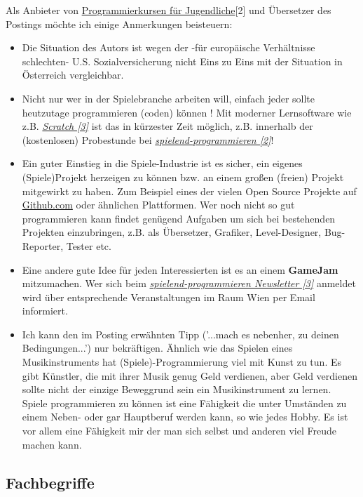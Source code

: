Als Anbieter von \href{http://spielend-programmieren.at}{Programmierkursen für Jugendliche}[2] und Übersetzer des Postings möchte ich einige Anmerkungen beisteuern:

\begin{itemize}
\item Die Situation des Autors ist wegen der -für europäische Verhältnisse schlechten- U.S. Sozialversicherung nicht Eins zu Eins mit der Situation in Österreich vergleichbar. 
\item Nicht nur wer in der Spielebranche arbeiten will, einfach jeder sollte heutzutage programmieren (coden) können ! Mit moderner Lernsoftware wie z.B. \href{http://scratch.mit.edu}{\textit{Scratch [3]}} ist das in kürzester Zeit möglich, z.B. innerhalb der (kostenlosen) Probestunde bei \href{http://spielend-programmieren.at}{\textit{spielend-programmieren [2]}}! 
\item Ein guter Einstieg in die Spiele-Industrie ist es sicher, ein eigenes (Spiele)Projekt herzeigen zu können bzw. an einem großen (freien) Projekt mitgewirkt zu haben. Zum Beispiel eines der vielen Open Source Projekte auf \href{http://github.com}{Github.com} oder ähnlichen Plattformen. Wer noch nicht so gut programmieren kann findet genügend Aufgaben um sich bei bestehenden Projekten einzubringen, z.B. als Übersetzer, Grafiker, Level-Designer, Bug-Reporter, Tester etc. 
\item Eine andere gute Idee für jeden Interessierten ist es an einem \textbf{GameJam} mitzumachen.  Wer sich beim \href{http://spielend-programmieren.at/de:mailinglist}{\textit{spielend-programmieren Newsletter [3]}} anmeldet wird  über entsprechende Veranstaltungen im Raum Wien per Email informiert.
\item Ich kann den im Posting erwähnten Tipp ('...mach es nebenher, zu deinen Bedingungen...') nur bekräftigen. Ähnlich wie das Spielen eines Musikinstruments hat (Spiele)-Programmierung viel mit Kunst zu tun. Es gibt Künstler, die mit ihrer Musik genug Geld verdienen, aber Geld verdienen sollte nicht der einzige Beweggrund sein ein Musikinstrument zu lernen. Spiele programmieren zu können ist eine Fähigkeit die unter Umständen zu einem Neben- oder gar Hauptberuf werden kann, so wie jedes Hobby. Es ist vor allem eine Fähigkeit mir der man sich selbst und anderen viel Freude machen kann. 
\end{itemize}


\subsection*{Fachbegriffe}

